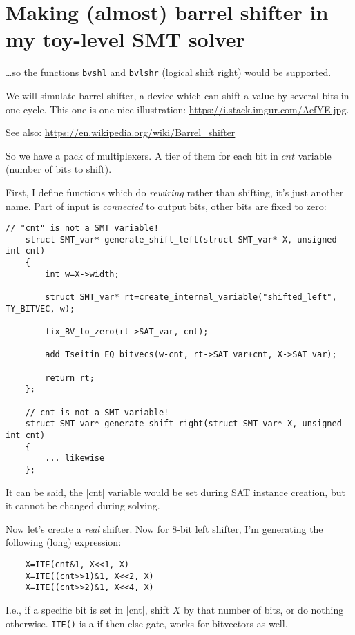 \section{Making (almost) barrel shifter in my toy-level SMT solver}

\dots so the functions \verb|bvshl| and \verb|bvlshr| (logical shift right) would be supported.

We will simulate barrel shifter, a device which can shift a value by several bits in one cycle.
This one is one nice illustration:
\url{https://i.stack.imgur.com/AefYE.jpg}.


See also: \url{https://en.wikipedia.org/wiki/Barrel_shifter}

So we have a pack of multiplexers. A tier of them for each bit in $cnt$ variable (number of bits to shift).

First, I define functions which do \textit{rewiring} rather than shifting, it's just another name.
Part of input is \textit{connected} to output bits, other bits are fixed to zero:

\begin{lstlisting}[style=customc]
	// "cnt" is not a SMT variable!
	struct SMT_var* generate_shift_left(struct SMT_var* X, unsigned int cnt)
	{
		int w=X->width;

		struct SMT_var* rt=create_internal_variable("shifted_left", TY_BITVEC, w);

		fix_BV_to_zero(rt->SAT_var, cnt);

		add_Tseitin_EQ_bitvecs(w-cnt, rt->SAT_var+cnt, X->SAT_var);

		return rt;
	};

	// cnt is not a SMT variable!
	struct SMT_var* generate_shift_right(struct SMT_var* X, unsigned int cnt)
	{
		... likewise
	};
\end{lstlisting}

It can be said, the |cnt| variable would be set during SAT instance creation, but it cannot be changed during solving.

Now let's create a \textit{real} shifter.
Now for 8-bit left shifter, I'm generating the following (long) expression:

\begin{lstlisting}
	X=ITE(cnt&1, X<<1, X)
	X=ITE((cnt>>1)&1, X<<2, X)
	X=ITE((cnt>>2)&1, X<<4, X)
\end{lstlisting}

I.e., if a specific bit is set in |cnt|, shift $X$ by that number of bits, or do nothing otherwise.
\verb|ITE()| is a if-then-else gate, works for bitvectors as well.

